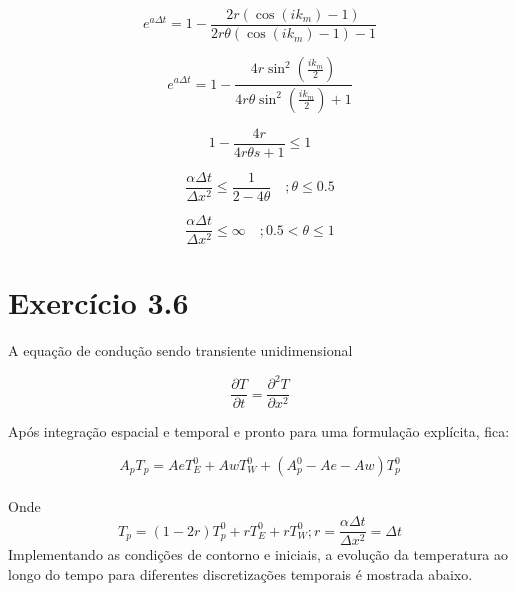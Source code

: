 \documentclass[]{article}
\begin{document}
\begin{equation}
	e^{a \Delta t} = 1 - \frac{2r (\cos(i k_m) - 1)}{2r \theta (\cos(i k_m) - 1) - 1}
\end{equation}

\begin{equation}
	e^{a \Delta t} = 1 - \frac{4r\sin^2\left(\frac{i k_m}{2}\right)}{4r \theta \sin^2\left(\frac{i k_m}{2}\right) + 1}
\end{equation}

\begin{equation}
	 1 - \frac{4r}{4r \theta s + 1}  \leq 1
\end{equation}

\begin{equation}
	\frac{\alpha \Delta t}{\Delta x^2} \leq \frac{1}{2 - 4\theta} \quad ; \theta \leq 0.5
\end{equation}


\begin{equation}
	\frac{\alpha \Delta t}{\Delta x^2} \leq \infty \quad ; 0.5 < \theta \leq 1
\end{equation}






\section*{Exercício 3.6}
A equação de condução sendo transiente unidimensional

\begin{equation}
	\frac{\partial T}{\partial t} = \frac{\partial^{2} T}{\partial x^{2}}
\end{equation}

\begin{flushleft}
	Após integração espacial e temporal e pronto para uma formulação explícita, fica:
\end{flushleft}

\begin{equation}
A_pT_p = AeT_E^{0} + AwT_W^{0} + (A_p^{0}- Ae - Aw)T_p^{0}
\end{equation}\\

Onde 
\begin{equation}
	T_p = (1-2r) T_p^{0} + r T_E^{0} + rT_W^{0}  ;  r = \dfrac{\alpha \Delta t}{\Delta x^{2}} = \Delta t
\end{equation}
Implementando as condições de contorno e iniciais, a evolução da temperatura ao longo do tempo para diferentes discretizações temporais é mostrada abaixo.
\end{document}

